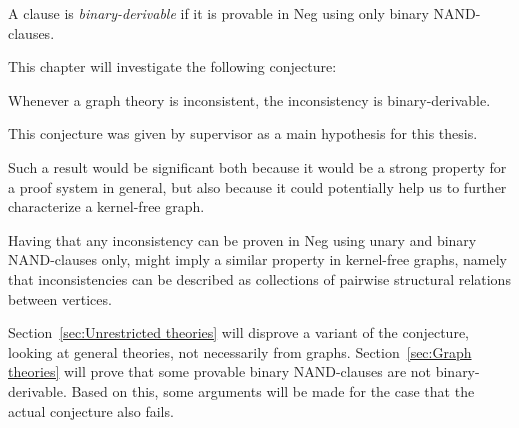 

\begin{definition}
  A clause is \textit{binary-derivable} if it is provable in Neg using only binary NAND-clauses.
\end{definition}
This chapter will investigate the following conjecture:
\begin{conjecture}
  Whenever a graph theory is inconsistent, the inconsistency is binary-derivable.
\end{conjecture}
This conjecture was given by supervisor as a main hypothesis for this thesis.

Such a result would be significant both because it would be a strong property for a proof system in general, but also because it could potentially help us to further characterize a kernel-free graph.

Having that any inconsistency can be proven in Neg using unary and binary NAND-clauses only, might imply a similar property in kernel-free graphs, namely that inconsistencies can be described as collections of pairwise structural relations between vertices.

Section~\ref{sec:Unrestricted theories} will disprove a variant of the conjecture, looking at general theories, not necessarily from graphs.
Section~\ref{sec:Graph theories} will prove that some provable binary NAND-clauses are not binary-derivable.
Based on this, some arguments will be made for the case that the actual conjecture also fails.
